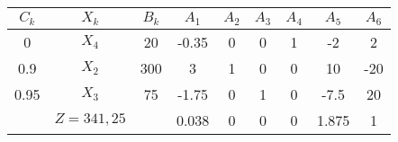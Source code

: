     \begin{tabular}{ccccccccc}
    \hline
    \hline
    $C_k$   & $X_k$   & $B_k$   & $A_1$   & $A_2$   & $A_3$   & $A_4$   & $A_5$   & $A_6$ \bigstrut\\
    \hline
    0       & $X_4$   & 20      & -0.35   & 0       & 0       & 1       & -2      & 2 \bigstrut[t]\\
    0.9     & $X_2$   & 300     & 3       & 1       & 0       & 0       & 10      & -20 \\
    0.95    & $X_3$   & 75      & -1.75   & 0       & 1       & 0       & -7.5    & 20 \bigstrut[b]\\
    \hline
            & $Z=341,25$ &         & 0.038   & 0       & 0       & 0       & 1.875   & 1 \bigstrut\\
    \hline
    \hline
    \end{tabular}%
